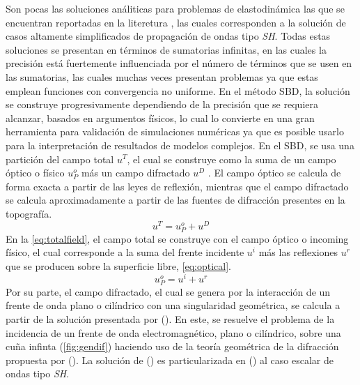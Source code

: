 \documentclass[spanish,letterpaper,12pt,twoside,openany]{article}
\begin{document}
Son pocas las soluciones análiticas para problemas de elastodinámica las que se encuentran reportadas en la literetura \citep[por ejemplo][entre otras pocas]{SanchezSesma1990, SanchezSesma1985, Pathak1974, Trifunac1973, Tsaur2008, Tsaur2010a, Tsaur2010b, Han2011, Zhang2012a, Zhang2012b, Gao2012, Tsaur2013, Chang2013}, las cuales corresponden a la solución de casos altamente simplificados de propagación de ondas tipo \textit{SH}. Todas estas soluciones se presentan en términos de sumatorias infinitas, en las cuales la precisión está fuertemente influenciada por el número de términos que se usen en las sumatorias, las cuales muchas veces presentan problemas ya que estas emplean funciones con convergencia no uniforme. En el método SBD, la solución se construye progresivamente dependiendo de la precisión que se requiera alcanzar, basados en argumentos físicos, lo cual lo convierte en una gran herramienta para validación de simulaciones numéricas ya que es posible usarlo para la interpretación de resultados de modelos complejos. En el SBD, se usa una partición del campo total $u^T$, el cual se construye como la suma de un campo óptico o físico $u^o_P$ más un campo difractado $u^D$ \citep{Gomez2013}. El campo óptico se calcula de forma exacta a partir de las leyes de reflexión, mientras que el campo difractado se calcula aproximadamente a partir de las fuentes de difracción presentes en la topografía.
%
\begin{equation} u^T = u^o_P + u^D \label{eq:totalfield} \end{equation}
%
En la \cref{eq:totalfield}, el campo total se construye con el campo óptico o incoming físico, el cual corresponde a la suma del frente incidente $u^i$ más las reflexiones $u^r$ que se producen sobre la superficie libre, \cref{eq:optical}.
%
\begin{equation} u^o_P = u^i+ u^r \label{eq:optical}\end{equation}
%
Por su parte, el campo difractado, el cual se genera por la interacción de un frente de onda plano o cilíndrico con una singularidad geométrica, se calcula a partir de la solución presentada por \citeauthor{Pathak1974} (\citeyear{Pathak1974}). En este, se resuelve el problema de la incidencia de un frente de onda electromagnético, plano o cilíndrico, sobre una cuña infinta (\cref{fig:gendif}) haciendo uso de la teoría geométrica de la difracción propuesta por \citeauthor{Keller1962} (\citeyear{Keller1962}). La solución de \citeauthor{Pathak1974} (\citeyear{Pathak1974}) es particularizada en \citeauthor{Jaramillo2013} (\citeyear{Jaramillo2013}) al caso escalar de ondas tipo \textit{SH}.
\end{document}
